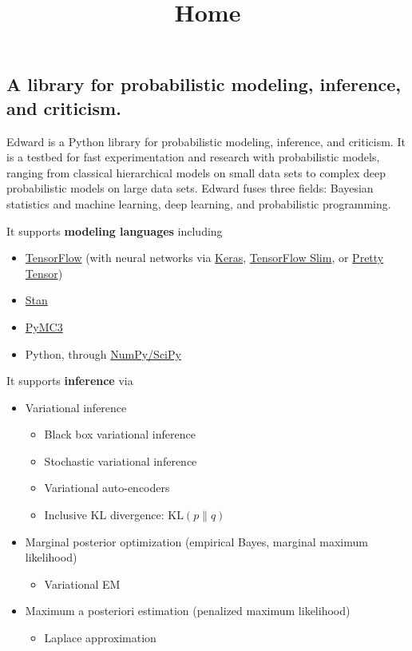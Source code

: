\title{Home}

\subsection{A library for probabilistic modeling, inference, and criticism.}
Edward is a Python library for probabilistic modeling, inference, and
criticism. It is a testbed for fast experimentation and research with
probabilistic models, ranging from classical hierarchical models on
small data sets to complex deep probabilistic models on large data
sets. Edward fuses three fields: Bayesian statistics and machine
learning, deep learning, and probabilistic programming.


It supports \textbf{modeling languages} including
\begin{itemize}
\item \href{https://www.tensorflow.org}{TensorFlow} (with neural
  networks via \href{http://keras.io}{Keras},
  \href{https://github.com/tensorflow/tensorflow/tree/master/tensorflow/contrib/slim}{TensorFlow
  Slim}, or
  \href{https://github.com/google/prettytensor}{Pretty Tensor})
\item \href{http://mc-stan.org}{Stan}
\item \href{http://pymc-devs.github.io/pymc3/}{PyMC3}
\item Python, through \href{http://scipy.org/}{NumPy/SciPy}
\end{itemize}

It supports \textbf{inference} via
\begin{itemize}
\item Variational inference
  \begin{itemize}
    \item Black box variational inference
    \item Stochastic variational inference
    \item Variational auto-encoders
    \item Inclusive KL divergence: $\text{KL}(p\|q)$
  \end{itemize}
\item Marginal posterior optimization (empirical Bayes, marginal maximum
likelihood)
  \begin{itemize}
    \item Variational EM
  \end{itemize}
\item Maximum a posteriori estimation (penalized maximum likelihood)
  \begin{itemize}
  \item Laplace approximation
  \end{itemize}
\end{itemize}

